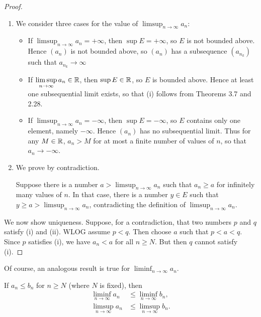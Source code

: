 \begin{proof} \
\begin{enumerate}[label=(\roman*)]
\item We consider three cases for the value of $\displaystyle\limsup_{n\to\infty}a_n$:
\begin{itemize}
    \item If $\displaystyle\limsup_{n\to\infty}a_n=+\infty$, then $\sup E=+\infty$, so $E$ is not bounded above. Hence $(a_n)$ is not bounded above, so $(a_n)$ has a subsequence $(a_{n_k})$ such that $a_{n_k}\to\infty$
    \item If $\displaystyle\limsup_{n\to\infty}a_n\in\mathbb R$, then $\sup E\in\mathbb R$, so $E$ is bounded above. Hence at least one subsequential limit exists, so that (i) follows from Theorems 3.7 and 2.28.
    \item If $\displaystyle\limsup_{n\to\infty}a_n=-\infty$, then $\sup E=-\infty$, so $E$ contains only one element, namely $-\infty$. Hence $(a_n)$ has no subsequential limit. Thus for any $M\in\mathbb R$, $a_n>M$ for at most a finite number of values of $n$, so that $a_n\to-\infty$.
\end{itemize}
\item We prove by contradiction.

Suppose there is a number $\displaystyle a>\limsup_{n\to\infty}a_n$ such that $a_n\ge a$ for infinitely many values of $n$. In that case, there is a number $y\in E$ such that $\displaystyle y\ge a>\limsup_{n\to\infty}a_n$, contradicting the definition of $\displaystyle\limsup_{n\to\infty}a_n$.
\end{enumerate}

We now show uniqueness. Suppose, for a contradiction, that two numbers $p$ and $q$ satisfy (i) and (ii). WLOG assume $p<q$. Then choose $a$ such that $p<a<q$. Since $p$ satisfies (i), we have $a_n<a$ for all $n\ge N$. But then $q$ cannot satisfy (i).
\end{proof}

Of course, an analogous result is true for $\displaystyle\liminf_{n\to\infty}a_n$. 

\begin{lemma}[Comparison]\label{lemma:limsup-liminf-comp}
If $a_n\le b_n$ for $n\ge N$ (where $N$ is fixed), then
\begin{align*}
\liminf_{n\to\infty}a_n&\le\liminf_{n\to\infty}b_n,\\
\limsup_{n\to\infty}a_n&\le\limsup_{n\to\infty}b_n.
\end{align*}
\end{lemma}


